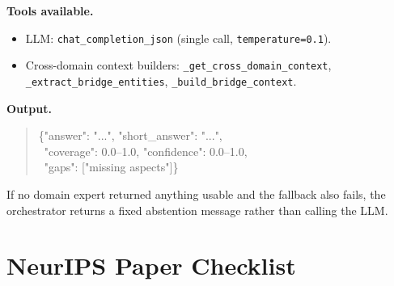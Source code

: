 \documentclass{article}
\begin{document}
\begin{agentbox}
\textbf{Tools available.}
\begin{itemize}[leftmargin=*,nosep]
\item LLM: \texttt{chat\_completion\_json} (single call, \texttt{temperature=0.1}).
\item Cross-domain context builders: \texttt{\_get\_cross\_domain\_context}, \texttt{\_extract\_bridge\_entities}, \texttt{\_build\_bridge\_context}.
\end{itemize}

\textbf{Output.}
\begin{quote}\footnotesize\ttfamily
\{"answer": "...", "short\_answer": "...",\\
\ "coverage": 0.0--1.0, "confidence": 0.0--1.0,\\
\ "gaps": ["missing aspects"]\}
\end{quote}
If no domain expert returned anything usable and the fallback also fails, the orchestrator returns a fixed abstention message rather than calling the LLM.
\end{agentbox}

\newpage
\section*{NeurIPS Paper Checklist}
\end{document}
